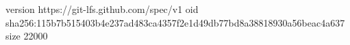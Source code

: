 version https://git-lfs.github.com/spec/v1
oid sha256:115b7b515403b4e237ad483ca4357f2e1d49db77bd8a38818930a56beac4a637
size 22000
